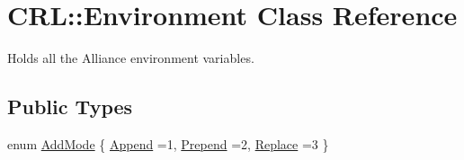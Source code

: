 \hypertarget{classCRL_1_1Environment}{}\section{C\+RL\+:\+:Environment Class Reference}
\label{classCRL_1_1Environment}


Holds all the Alliance environment variables.  


\subsection*{Public Types}
\begin{DoxyCompactItemize}
\item 
enum \hyperlink{classCRL_1_1Environment_ac5692c2f5d20e892573a3d46de222aeb}{Add\+Mode} \{ \newline
\hyperlink{classCRL_1_1Environment_ac5692c2f5d20e892573a3d46de222aeba69ce578d2eeb6a8de507920ccf673b8d}{Append} =1, 
\newline
\hyperlink{classCRL_1_1Environment_ac5692c2f5d20e892573a3d46de222aeba9acc311bf991f5e62be5ea9333083fd0}{Prepend} =2, 
\newline
\hyperlink{classCRL_1_1Environment_ac5692c2f5d20e892573a3d46de222aeba61fc1f828e487ed148c456f3d37be83a}{Replace} =3
 \}
\end{DoxyCompactItemize}
